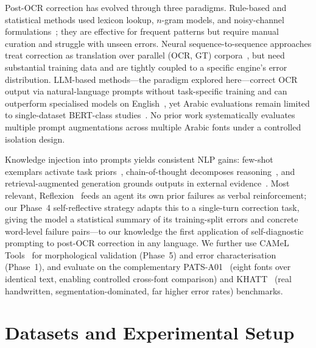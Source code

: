 \documentclass[conference]{IEEEtran}
\begin{document}
Post-OCR correction has evolved through three paradigms. Rule-based and
statistical methods used lexicon lookup, $n$-gram models, and noisy-channel
formulations~\cite{afli2016}; they are effective for frequent patterns but
require manual curation and struggle with unseen errors. Neural
sequence-to-sequence approaches treat correction as translation over parallel
(OCR, GT) corpora~\cite{dong2018,nguyen2021}, but need substantial training data
and are tightly coupled to a specific engine's error distribution. LLM-based
methods---the paradigm explored here---correct OCR output via natural-language
prompts without task-specific training and can outperform specialised models on
English~\cite{llm_ocr_correction}, yet Arabic evaluations remain limited to
single-dataset BERT-class studies~\cite{arabic_bert_ocr}. No prior work
systematically evaluates multiple prompt augmentations across multiple Arabic
fonts under a controlled isolation design.

Knowledge injection into prompts yields consistent NLP gains: few-shot
exemplars activate task priors~\cite{brown2020}, chain-of-thought decomposes
reasoning~\cite{wei2022}, and retrieval-augmented generation grounds outputs in
external evidence~\cite{lewis2020}. Most relevant, Reflexion~\cite{shinn2023}
feeds an agent its own prior failures as verbal reinforcement; our Phase~4
self-reflective strategy adapts this to a single-turn correction task, giving
the model a statistical summary of its training-split errors and concrete
word-level failure pairs---to our knowledge the first application of
self-diagnostic prompting to post-OCR correction in any language. We further use
CAMeL Tools~\cite{obeid2020,habash2010} for morphological validation (Phase~5)
and error characterisation (Phase~1), and evaluate on the complementary
PATS-A01~\cite{pats} (eight fonts over identical text, enabling controlled
cross-font comparison) and KHATT~\cite{khatt} (real handwritten,
segmentation-dominated, far higher error rates) benchmarks.

\section{Datasets and Experimental Setup}
\end{document}
